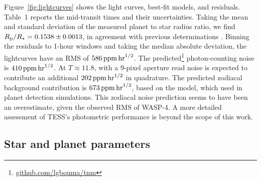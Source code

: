 \documentclass[12pt,twocolumn,tighten]{aastex62}
\begin{document}
Figure~\ref{fig:lightcurves} shows the light curves, best-fit models,
and residuals.  Table~1 reports the mid-transit times and their
uncertainties.  Taking the mean and standard deviation of the measured
planet to star radius ratio, we find $R_{\rm
p}/R_\star=0.1538\pm0.0013$, in agreement with previous determinations
\citep{wilson_wasp-4b_2008,gillon_improved_2009,winn_transit_2009,southworth_high-precision_2009}.
Binning the residuals to 1-hour windows and taking the median absolute
deviation, the lightcurves have an RMS of $586\,{\rm ppm}\,{\rm
hr}^{1/2}$.  The predicted\footnote{\url{github.com/lgbouma/tnm}}
photon-counting noise is $410\,{\rm ppm}\,{\rm hr}^{1/2}$.  At
$T\approx11.8$, with a 9-pixel aperture read noise is expected to
contribute an additional $202\,{\rm ppm}\,{\rm hr}^{1/2}$ in
quadrature.  The predicted zodiacal background contribution is
$673\,{\rm ppm}\,{\rm hr}^{1/2}$, based on the
\citet{winn_photonflux_2013} model, which \citet{Sullivan_2015} used
in planet detection simulations.  This zodiacal noise prediction seems
to have been an overestimate, given the observed RMS of WASP-4.  A
more detailed assessment of TESS's photometric performance is beyond
the scope of this work.


\subsection{Star and planet parameters}
\label{sec:system_parameters}
\end{document}
